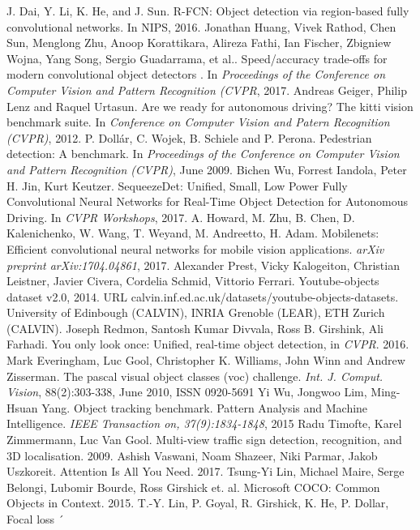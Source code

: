 \documentclass[conference]{IEEEtran}
\begin{document}
\begin{thebibliography}{00}
 J. Dai, Y. Li, K. He, and J. Sun. R-FCN: Object detection via
region-based fully convolutional networks. In NIPS, 2016.
 Jonathan Huang, Vivek Rathod, Chen Sun, Menglong Zhu, Anoop Korattikara, Alireza Fathi, Ian Fischer, Zbigniew Wojna, Yang Song, Sergio Guadarrama, et al.. Speed/accuracy trade-offs for modern convolutional object detectors . In \textit{Proceedings of the Conference on Computer Vision and Pattern Recognition (CVPR}, 2017.
 Andreas Geiger, Philip Lenz and Raquel Urtasun. Are we ready for autonomous driving? The kitti vision benchmark suite. In \textit{Conference on Computer Vision and Patern Recognition (CVPR)}, 2012.
 P. Dollár, C. Wojek, B. Schiele and P. Perona. Pedestrian detection: A benchmark. In \textit{Proceedings of the Conference on Computer Vision and Pattern Recognition (CVPR)}, June 2009.
 Bichen Wu, Forrest Iandola, Peter H. Jin, Kurt Keutzer. SequeezeDet: Unified, Small, Low Power Fully Convolutional Neural Networks for Real-Time Object Detection for Autonomous Driving. In \textit{CVPR Workshops}, 2017.
 A. Howard, M. Zhu, B. Chen, D. Kalenichenko, W. Wang, T. Weyand, M. Andreetto, H. Adam. Mobilenets: Efficient convolutional neural networks for mobile vision applications. \textit{arXiv preprint arXiv:1704.04861}, 2017.
 Alexander Prest, Vicky Kalogeiton, Christian Leistner, Javier Civera, Cordelia Schmid, Vittorio Ferrari. Youtube-objects dataset v2.0, 2014. URL calvin.inf.ed.ac.uk/datasets/youtube-objects-datasets. University of Edinbough (CALVIN), INRIA Grenoble (LEAR), ETH Zurich (CALVIN). 
 Joseph Redmon, Santosh Kumar Divvala, Ross B. Girshink, Ali Farhadi. You only look once: Unified, real-time object detection, in \textit{CVPR}. 2016.
 Mark Everingham, Luc Gool, Christopher K. Williams, John Winn and Andrew Zisserman. The pascal visual object classes (voc) challenge. \textit{Int. J. Comput. Vision}, 88(2):303-338, June 2010, ISSN 0920-5691
 Yi Wu, Jongwoo Lim, Ming-Hsuan Yang. Object tracking benchmark. Pattern Analysis and Machine Intelligence. \textit{IEEE Transaction on, 37(9):1834-1848}, 2015
 Radu Timofte, Karel Zimmermann, Luc Van Gool. Multi-view traffic sign detection, recognition, and 3D localisation. 2009.
 Ashish Vaswani, Noam Shazeer, Niki Parmar, Jakob Uszkoreit. Attention Is All You Need. 2017.
 Tsung-Yi Lin, Michael Maire, Serge Belongi, Lubomir Bourde, Ross Girshick et. al. Microsoft COCO: Common Objects in Context. 2015.
 T.-Y. Lin, P. Goyal, R. Girshick, K. He, P. Dollar, Focal loss ´

\end{thebibliography}
\end{document}
